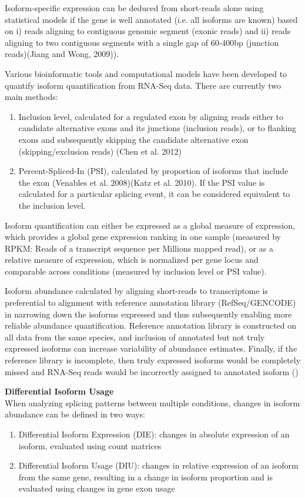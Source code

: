 Isoform-specific expression can be deduced from short-reads alone using statistical models if the gene is well annotated (i.e. all isoforms are known) based on i) reads aligning to contiguous genomic segment (exonic reads) and ii) reads aligning to two contiguous segments with a single gap of 60-400bp (junction reads)(Jiang and Wong, 2009)).

Various bioinformatic tools and computational models have been developed to quantify isoform quantification from RNA-Seq data. There are currently two main methods:
\begin{enumerate}
	\item Inclusion level, calculated for a regulated exon by aligning reads either to candidate alternative exons and its junctions (inclusion reads), or to flanking exons and subsequently skipping the candidate alternative exon (skipping/exclusion reads) (Chen et al. 2012)
	\item Percent-Spliced-In (PSI), calculated by proportion of isoforms that include the exon (Venables et al. 2008)(Katz et al. 2010). If the PSI value is calculated for a particular splicing event, it can be considered equivalent to the inclusion level. 
\end{enumerate}
Isoform quantification can either be expressed as a global measure of expression, which provides a global gene expression ranking in one sample (measured by RPKM: Reads of a transcript sequence per Millions mapped read), or as a relative measure of expression, which is normalized per gene locus and comparable across conditions (measured by inclusion level or PSI value). 

Isoform abundance calculated by aligning short-reads to transcriptome is preferential to alignment with reference annotation library (RefSeq/GENCODE) in narrowing down the isoforms expressed and thus subsequently enabling more reliable abundance quantification. Reference annotation library is constructed on all data from the same species, and inclusion of annotated but not truly expressed isoforms can increase variability of abundance estimates. Finally, if the reference library is incomplete, then truly expressed isoforms would be completely missed and RNA-Seq reads would be incorrectly assigned to annotated isoform (\cite{Au2013})


\textbf{Differential Isoform Usage }\\
\label{intro:dtu}
When analyzing splicing patterns between multiple conditions, changes in isoform abundance can be defined in two ways: 
\begin{enumerate}
	\item Differential Isoform Expression (DIE): changes in absolute expression of an isoform, evaluated using count matrices 
	\item Differential Isoform Usage (DIU): changes in relative expression of an isoform from the same gene, resulting in a change in isoform proportion and is evaluated using changes in gene exon usage	
\end{enumerate}


